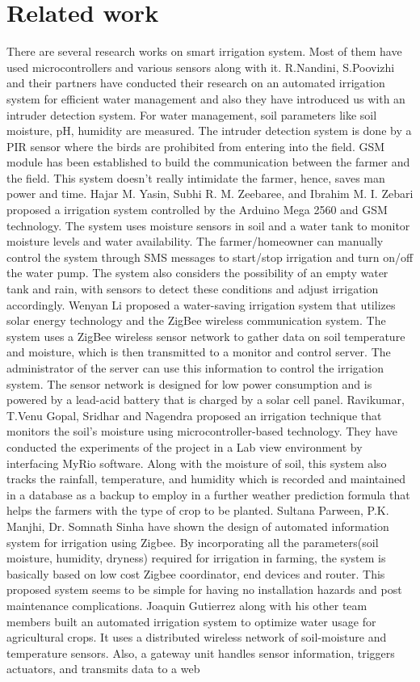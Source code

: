 \documentclass[conference]{IEEEtran}
\begin{document}
	\section{Related work}
	There are several research works on smart irrigation system. Most of them have used microcontrollers and various sensors along with it. R.Nandini, S.Poovizhi and their partners have conducted their research on an automated irrigation system for efficient water management and also they have introduced us with an intruder detection system. For water management, soil parameters like soil moisture, pH, humidity are measured. The intruder detection system is done by a PIR sensor where the birds are prohibited from entering into the field. GSM module has been established to build the communication between the farmer and the field. This system doesn’t really intimidate the farmer, hence, saves man power and time\cite{c1}. Hajar M. Yasin, Subhi R. M. Zeebaree, and Ibrahim M. I. Zebari proposed a irrigation system controlled by the Arduino Mega 2560 and GSM technology. The system uses moisture sensors in soil and a water tank to monitor moisture levels and water availability. The farmer/homeowner can manually control the system through SMS messages to start/stop irrigation and turn on/off the water pump. The system also considers the possibility of an empty water tank and rain, with sensors to detect these conditions and adjust irrigation accordingly\cite{c2}. Wenyan Li proposed a water-saving irrigation system that utilizes solar energy technology and the ZigBee wireless communication system. The system uses a ZigBee wireless sensor network to gather data on soil temperature and moisture, which is then transmitted to a monitor and control server. The administrator of the server can use this information to control the irrigation system. The sensor network is designed for low power consumption and is powered by a lead-acid battery that is charged by a solar cell panel\cite{c3}. Ravikumar, T.Venu Gopal, Sridhar and Nagendra proposed an irrigation technique that monitors the soil’s moisture using microcontroller-based technology. They have conducted the experiments of the project in a Lab view environment by interfacing MyRio software. Along with the moisture of soil, this system also tracks the rainfall, temperature, and humidity which is recorded and maintained in a database as a backup to employ in a further weather prediction formula that helps the farmers with the type of crop to be planted\cite{c4}. Sultana Parween, P.K. Manjhi, Dr. Somnath Sinha have shown the design of automated information system for irrigation using Zigbee. By incorporating all the parameters(soil moisture, humidity, dryness) required for irrigation in farming, the system is basically based on low cost Zigbee coordinator, end devices and router. This proposed system seems to be simple for having no installation hazards and post maintenance complications\cite{c5}. Joaquin Gutierrez along with his other team members built an automated irrigation system to optimize water usage for agricultural crops. It uses a distributed wireless network of soil-moisture and temperature sensors. Also, a gateway unit handles sensor information, triggers actuators, and transmits data to a web 
\end{document}

